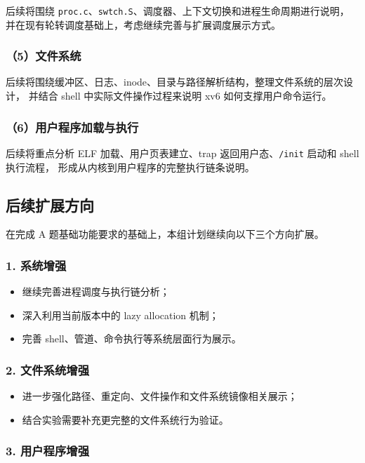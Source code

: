 \documentclass[12pt,a4paper]{ctexart}
\begin{document}
后续将围绕 \texttt{proc.c}、\texttt{swtch.S}、调度器、上下文切换和进程生命周期进行说明，
并在现有轮转调度基础上，考虑继续完善与扩展调度展示方式。

\subsubsection*{（5）文件系统}

后续将围绕缓冲区、日志、inode、目录与路径解析结构，整理文件系统的层次设计，
并结合 shell 中实际文件操作过程来说明 xv6 如何支撑用户命令运行。

\subsubsection*{（6）用户程序加载与执行}

后续将重点分析 ELF 加载、用户页表建立、trap 返回用户态、\texttt{/init} 启动和 shell 执行流程，
形成从内核到用户程序的完整执行链条说明。

\subsection{后续扩展方向}

在完成 A 题基础功能要求的基础上，本组计划继续向以下三个方向扩展。

\subsubsection*{1. 系统增强}

\begin{itemize}
  \item 继续完善进程调度与执行链分析；
  \item 深入利用当前版本中的 lazy allocation 机制；
  \item 完善 shell、管道、命令执行等系统层面行为展示。
\end{itemize}

\subsubsection*{2. 文件系统增强}

\begin{itemize}
  \item 进一步强化路径、重定向、文件操作和文件系统镜像相关展示；
  \item 结合实验需要补充更完整的文件系统行为验证。
\end{itemize}

\subsubsection*{3. 用户程序增强}
\end{document}
